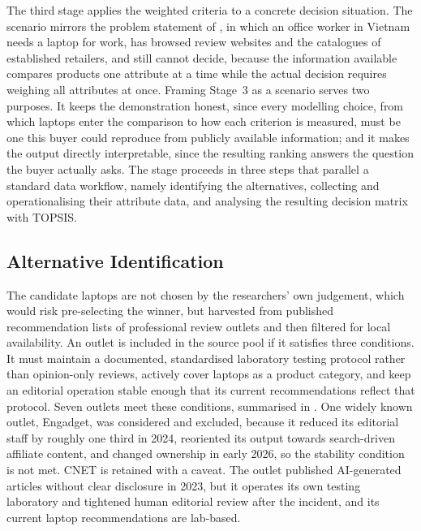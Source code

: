 The third stage applies the weighted criteria to a concrete decision situation. The
scenario mirrors the problem statement of , in which an office worker in
Vietnam needs a laptop for work, has browsed review websites and the catalogues of
established retailers, and still cannot decide, because the information available
compares products one attribute at a time while the actual decision requires weighing all
attributes at once. Framing Stage~3 as a scenario serves two purposes. It keeps the demonstration
honest, since every modelling choice, from which laptops enter the comparison to how each
criterion is measured, must be one this buyer could reproduce from publicly available
information; and it makes the output directly interpretable, since the resulting ranking
answers the question the buyer actually asks. The stage proceeds in three steps that
parallel a standard data workflow, namely identifying the alternatives, collecting and
operationalising their attribute data, and analysing the resulting decision matrix with
TOPSIS.

\subsection{Alternative Identification}\label{subsec:alternatives}

The candidate laptops are not chosen by the researchers' own judgement, which would risk
pre-selecting the winner, but harvested from published recommendation lists of
professional review outlets and then filtered for local availability. An outlet is
included in the source pool if it satisfies three conditions. It must maintain a
documented, standardised laboratory testing protocol rather than opinion-only reviews,
actively cover laptops as a product category, and keep an editorial operation stable
enough that its current recommendations reflect that protocol. Seven outlets meet these
conditions, summarised in . One widely known outlet, Engadget, was
considered and excluded, because it reduced its editorial staff by roughly one third in
2024, reoriented its output towards search-driven affiliate content, and changed
ownership in early 2026, so the stability condition is not met. CNET is retained with a
caveat. The outlet published AI-generated articles without clear disclosure in 2023, but
it operates its own testing laboratory and tightened human editorial review after the
incident, and its current laptop recommendations are lab-based.

